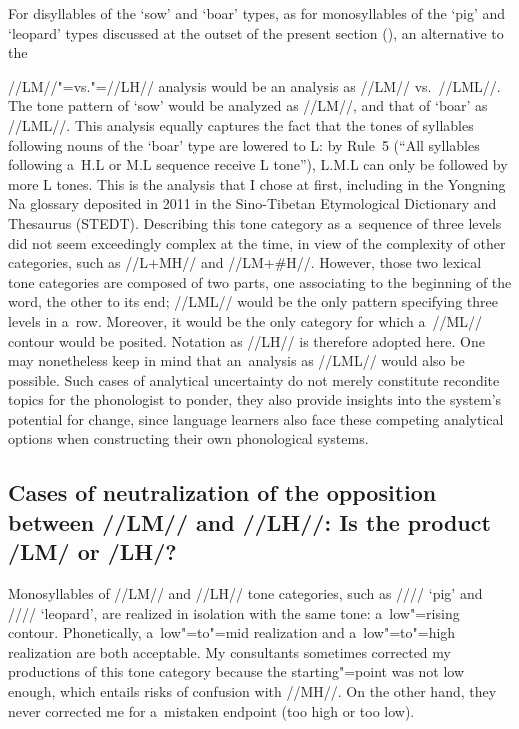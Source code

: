 {{{{For disyllables of the ‘sow’ and ‘boar’ types, as for monosyllables of the ‘pig’ and ‘leopard’ types discussed at the outset of the present section (), an alternative to the {\mbox{//LM//}"=vs."=\mbox{//LH//} analysis would be an analysis as \mbox{//LM//} vs.\ \mbox{//LML//.} The tone pattern of ‘sow’ would be analyzed as \mbox{//LM//}, and that of ‘boar’ as
\mbox{//LML//}. This analysis equally captures the fact that the tones of syllables following nouns of the ‘boar’ type are lowered to L: by Rule~5 (“All syllables following a~H.L or M.L sequence receive L tone”), L.M.L can only be followed
by more L tones. This is the analysis that I chose at first, including in the Yongning Na glossary deposited in 2011 in the Sino-Tibetan Etymological Dictionary and Thesaurus (STEDT). Describing this tone category as
a~sequence of three levels did not seem exceedingly complex at the time, in view of the complexity
of other categories, such as //L+MH// and //LM+\#H//. However, those two lexical tone
categories are composed of two parts, one associating to the beginning of the word, the other to its
end; \mbox{//LML//} would be the only pattern specifying three levels in a~row. Moreover, it would be the
only category for which a~//ML// contour would be posited. Notation as \mbox{//LH//} is therefore
adopted here. One may nonetheless keep in mind that an~analysis as \mbox{//LML//} would also be
possible. Such cases of analytical uncertainty do not merely constitute recondite topics for the
phonologist to ponder, they also provide insights into the system’s potential for change, since
language learners also face these competing analytical options when constructing their own
phonological systems.


\subsection[Cases of neutralization of \mbox{//LM//} and \mbox{//LH//}]{Cases of neutralization of the opposition between \mbox{//LM//} and \mbox{//LH//}: Is the product /LM/ or /LH/?}
\label{sec:neutralizationoflmandlhinisolationistheproductlmorlh}

Monosyllables of \mbox{//LM//} and \mbox{//LH//} tone categories, such as //// ‘pig’ and //// ‘leopard’,
are realized in isolation with the same tone: a~low"=rising contour. Phonetically, a~low"=to"=mid
realization and a~low"=to"=high realization are both acceptable. My consultants sometimes corrected my
productions of this tone category because the starting"=point was not low enough, which entails risks of confusion with \mbox{//MH//}. On the other hand, they never corrected me for a~mistaken
endpoint (too high or too low).

}}}}}
